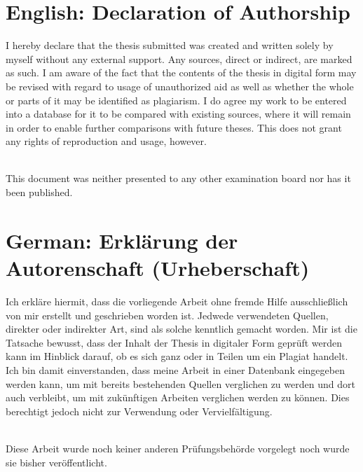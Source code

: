 \documentclass[openany, a4paper]{amsbook}
\theoremstyle{definition}
\numberwithin{equation}{chapter}
\begin{document}
\section*{English: Declaration of Authorship}

\noindent
I hereby declare that the thesis submitted was created and written
solely by myself without any external support. Any sources, direct
or indirect, are marked as such. I am aware of the fact that the
contents of the thesis in digital form may be revised with regard
to usage of unauthorized aid as well as whether the whole or parts
of it may be identified as plagiarism. I do agree my work to be
entered into a database for it to be compared with existing
sources, where it will remain in order to enable further
comparisons with future theses. This does not grant any rights of
reproduction and usage, however.

~\\
\noindent
This document was neither presented to any other examination board
nor has it been published.


\section*{German: Erkl\"arung der Autorenschaft (Urheberschaft)}

\noindent
Ich erkl\"are hiermit, dass die vorliegende Arbeit ohne fremde
Hilfe ausschlie\ss lich von mir erstellt und geschrieben worden
ist. Jedwede verwendeten Quellen, direkter oder indirekter
Art, sind als solche kenntlich gemacht worden. Mir ist die
Tatsache bewusst, dass der Inhalt der Thesis in digitaler Form
gepr\"uft werden kann im Hinblick darauf, ob es sich ganz oder
in Teilen um ein Plagiat handelt. Ich bin damit einverstanden,
dass meine Arbeit in einer Datenbank eingegeben werden kann,
um mit bereits bestehenden Quellen verglichen zu werden und
dort auch verbleibt, um mit zuk\"unftigen Arbeiten verglichen
werden zu k\"onnen. Dies berechtigt jedoch nicht zur Verwendung
oder Vervielf\"altigung.

~\\
\noindent
Diese Arbeit wurde noch keiner anderen Pr\"ufungsbeh\"orde
vorgelegt noch wurde sie bisher ver\"offentlicht.

\vfill
\end{document}
